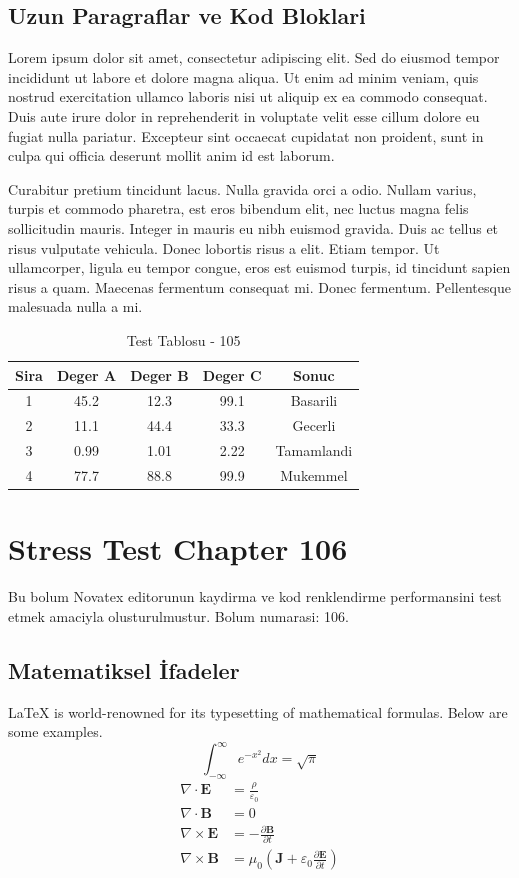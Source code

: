\documentclass[12pt,a4paper]{article}
\begin{document}
\subsection{Uzun Paragraflar ve Kod Bloklari}
Lorem ipsum dolor sit amet, consectetur adipiscing elit. Sed do eiusmod tempor incididunt ut labore et dolore magna aliqua. Ut enim ad minim veniam, quis nostrud exercitation ullamco laboris nisi ut aliquip ex ea commodo consequat. Duis aute irure dolor in reprehenderit in voluptate velit esse cillum dolore eu fugiat nulla pariatur. Excepteur sint occaecat cupidatat non proident, sunt in culpa qui officia deserunt mollit anim id est laborum.

Curabitur pretium tincidunt lacus. Nulla gravida orci a odio. Nullam varius, turpis et commodo pharetra, est eros bibendum elit, nec luctus magna felis sollicitudin mauris. Integer in mauris eu nibh euismod gravida. Duis ac tellus et risus vulputate vehicula. Donec lobortis risus a elit. Etiam tempor. Ut ullamcorper, ligula eu tempor congue, eros est euismod turpis, id tincidunt sapien risus a quam. Maecenas fermentum consequat mi. Donec fermentum. Pellentesque malesuada nulla a mi.

\begin{table}[h!]
\centering
\begin{tabular}{|c|c|c|c|c|}
\hline
\textbf{Sira} & \textbf{Deger A} & \textbf{Deger B} & \textbf{Deger C} & \textbf{Sonuc} \\
\hline
1 & 45.2 & 12.3 & 99.1 & Basarili \\
2 & 11.1 & 44.4 & 33.3 & Gecerli \\
3 & 0.99 & 1.01 & 2.22 & Tamamlandi \\
4 & 77.7 & 88.8 & 99.9 & Mukemmel \\
\hline
\end{tabular}
\caption{Test Tablosu - 105}
\end{table}

\newpage
\section{Stress Test Chapter 106}
Bu bolum Novatex editorunun kaydirma ve kod renklendirme performansini test etmek amaciyla olusturulmustur. Bolum numarasi: 106.

\subsection{Matematiksel İfadeler}
\LaTeX{} is world-renowned for its typesetting of mathematical formulas. Below are some examples.
\begin{equation}
\int_{-\infty}^{\infty} e^{-x^2} dx = \sqrt{\pi}
\end{equation}
\begin{align}
\nabla \cdot \mathbf{E} &= \frac{\rho}{\varepsilon_0} \\
\nabla \cdot \mathbf{B} &= 0 \\
\nabla \times \mathbf{E} &= -\frac{\partial \mathbf{B}}{\partial t} \\
\nabla \times \mathbf{B} &= \mu_0\left(\mathbf{J} + \varepsilon_0 \frac{\partial \mathbf{E}}{\partial t}\right)
\end{align}
\end{document}
